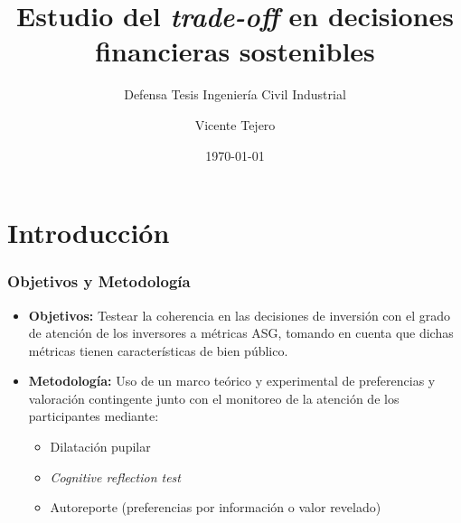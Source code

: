 \documentclass{beamer}
\title{Estudio del \textit{trade-off} en decisiones financieras sostenibles}
\subtitle{Defensa Tesis Ingeniería Civil Industrial}
\author{Vicente Tejero}
\institute[Universidad de los Andes]
{
    Universidad de los Andes \\
    \medskip
    \textit{Profesor guía: Sebastián Cea}
}
\date{\today}
\begin{document}
\begin{frame}
    \titlepage
\end{frame}

\begin{frame}
    \tableofcontents
\end{frame}

\section{Introducción}


\begin{frame}
    \frametitle{Objetivos y Metodología}
    \begin{itemize}
        \item \textbf{Objetivos:} Testear la coherencia en las decisiones de inversión con el grado de atención de los inversores a métricas ASG, tomando en cuenta que dichas métricas tienen características de bien público.
        \item \textbf{Metodología:} Uso de un marco teórico y experimental de preferencias y valoración contingente junto con el monitoreo de la atención de los participantes mediante:
        \begin{itemize}
            \item Dilatación pupilar 
            \item \emph{Cognitive reflection test}
            \item Autoreporte (preferencias por información o valor revelado)
        \end{itemize}
    \end{itemize}
\end{frame}
\end{document}
